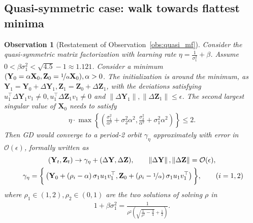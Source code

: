 \documentclass{article}
\theoremstyle{plain}
\newtheorem{obs}{Observation}
\theoremstyle{remark}
\newcommand{\norm}[1]{\left\lVert#1\right\rVert}
\def\O{\mathcal{O}}
\def\bX{\mathbf{X}}
\def\bY{\mathbf{Y}}
\def\bZ{\mathbf{Z}}
\begin{document}
\subsection{Quasi-symmetric case: walk towards flattest minima} \label{sec:app_mf_quasisym}
\begin{obs}[Restatement of Observation~\ref{obs:quasi_mf}]
    Consider the quasi-symmetric matrix factorization with learning rate $\eta = \frac{1}{\sigma_1^2}+\beta$. Assume $0<\beta\sigma_1^2< \sqrt{4.5}-1\approx 1.121$. {Consider a minimum $(\bY_0=\alpha\bX_0, \bZ_0=\nicefrac{1}{\alpha}\mathbf{X}_0), \alpha>0$}. The initialization is around the minimum, as ${\mathbf{Y}_1 = \bY_0 +\Delta \mathbf{Y}_1, \mathbf{Z}_1 = \bZ_0 + \Delta \mathbf{Z}_1}$, with the deviations satisfying $u_1^\top {\Delta\mathbf{Y}_{1}} v_1 \neq 0, u_1^\top {\Delta\mathbf{Z}_1} v_1 \neq 0$ and $\norm{{\Delta\mathbf{Y}_1}}, \norm{{\Delta\mathbf{Z}_1}}\le \epsilon$. The second largest singular value of $\bX_0$ needs to satisfy
    \begin{align}
        \eta\cdot\max\left\{
                (\frac{\sigma_1^2}{\alpha^2}+\sigma_2^2\alpha^2, \frac{\sigma_2^2}{\alpha^2}+\sigma_1^2\alpha^2)
            \right\}
        \le 2.
    \end{align}
    Then GD would converge to a period-2 orbit $\gamma_{\eta}$ approximately with error in $\O(\epsilon)$, formally written as
    \begin{gather}
        (\mathbf{Y}_t, \mathbf{Z}_t) \rightarrow \gamma_{\eta} + (\Delta\mathbf{Y}, \Delta\mathbf{Z}), 
        ~~~~~~\norm{\Delta\mathbf{Y}}, \norm{\Delta\mathbf{Z}}=\O(\epsilon), \\\
        \gamma_{\eta} = \bigg\{\left(\mathbf{Y}_0 + \left(\rho_i-\alpha\right) \sigma_1 u_1 v_1^\top , \mathbf{Z}_0 + \left(\rho_i-\nicefrac{1}{\alpha}\right) \sigma_1 u_1 v_1^\top\right)\bigg\}, ~~~~~~(i=1,2)
    \end{gather}
    where $\rho_1\in (1,2),\rho_2\in(0,1)$ are the two solutions of solving $\rho$ in
    \begin{align}
        1+\beta \sigma_1^2 = \frac{1}{\rho^2 \left(\sqrt{\frac{1}{\rho^2}-\frac{3}{4}}+\frac{1}{2} \right)}.
    \end{align}
\end{obs}
\end{document}
